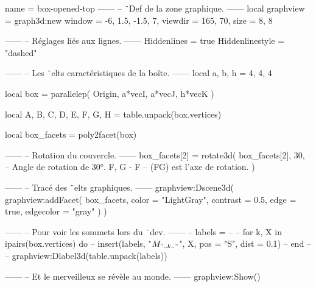 \documentclass{standalone}
\begin{document}
\begin{luadraw}{name = box-opened-top}
------
-- ¨Def de la zone graphique.
------
local graphview = graph3d:new{
  window  = {-6, 1.5, -1.5, 7},
  viewdir = {165, 70},
  size    = {8, 8}
}

------
-- Réglages liés aux lignes.
------
Hiddenlines     = true
Hiddenlinestyle = "dashed"

------
-- Les ¨elts caractéristiques de la boîte.
------
local a, b, h = 4, 4, 4

local box = parallelep(
  Origin,
  a*vecI, a*vecJ, h*vecK
)

local A, B, C, D, E, F, G, H = table.unpack(box.vertices)

local box_facets = poly2facet(box)

------
-- Rotation du couvercle.
------
box_facets[2] = rotate3d(
  box_facets[2],
  30,         -- Angle de rotation de 30°.
  {F, G - F}  -- (FG) est l'axe de rotation.
)

------
-- Tracé des ¨elts graphiques.
------
graphview:Dscene3d(
  graphview:addFacet(
    box_facets,
    {
      color     = "LightGray",
      contrast  = 0.5,
      edge      = true,
      edgecolor = "gray"
    }
  )
)

------
-- Pour voir les sommets lors du ¨dev.
------
-- labels = {}
--
-- for k, X in ipairs(box.vertices) do
--   insert(labels, {"$M_{".. k .."}$", X, {pos = "S", dist = 0.1}})
-- end
--
-- graphview:Dlabel3d(table.unpack(labels))

------
-- Et le merveilleux se révèle au monde.
------
graphview:Show()
\end{luadraw}
\end{document}
